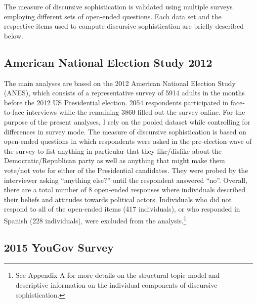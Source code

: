 \documentclass[12pt]{article}
\begin{document}
The measure of discursive sophistication is validated using multiple surveys employing different sets of open-ended questions. Each data set and the respective items used to compute discursive sophistication are briefly described below. %



\subsection*{American National Election Study 2012}

The main analyses are based on the 2012 American National Election Study (ANES), which consists of a representative survey of 5914 adults in the months before the 2012 US Presidential election. 2054 respondents participated in face-to-face interviews while the remaining 3860 filled out the survey online. For the purpose of the present analyses, I rely on the pooled dataset while controlling for differences in survey mode. The measure of discursive sophistication is based on open-ended questions in which respondents were asked in the pre-election wave of the survey to list anything in particular that they like/dislike about the Democratic/Republican party as well as anything that might make them vote/not vote for either of the Presidential candidates. They were probed by the interviewer asking ``anything else?'' until the respondent answered ``no''. Overall, there are a total number of 8 open-ended responses where individuals described their beliefs and attitudes towards political actors. Individuals who did not respond to all of the open-ended items (417 individuals), or who responded in Spanish (228 individuals), were excluded from the analysis.\footnote{See Appendix A for more details on the structural topic model and descriptive information on the individual components of discursive sophistication.}

\subsection*{2015 YouGov Survey}
\end{document}
